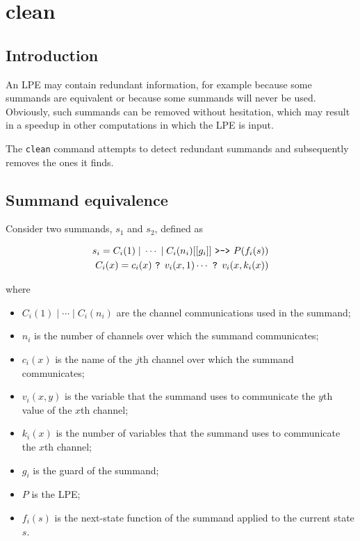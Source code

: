 \chapter{clean}

\section{Introduction}

An LPE may contain redundant information, for example because some summands are equivalent or because some summands will never be used.
Obviously, such summands can be removed without hesitation, which may result in a speedup in other computations in which the LPE is input.

The \texttt{clean} command attempts to detect redundant summands and subsequently removes the ones it finds.

\section{Summand equivalence}

Consider two summands, $s_1$ and $s_2$, defined as

\begin{align*}
s_i = C_i(1) \;|\; \cdots{} \;|\; C_i(n_i) [[g_i]] \text{ \texttt{>->} } P(f_i(s)) \\
C_i(x) = c_i(x) \text{ \texttt{?} } v_i(x,1) \cdots{} \text{ \texttt{?} } v_i(x,k_i(x))
\end{align*}

where

\begin{itemize}
\item $C_i(1) \;|\; \cdots{} \;|\; C_i(n_i)$ are the channel communications used in the summand;
\item $n_i$ is the number of channels over which the summand communicates;
\item $c_i(x)$ is the name of the $j$th channel over which the summand communicates;
\item $v_i(x,y)$ is the variable that the summand uses to communicate the $y$th value of the $x$th channel;
\item $k_i(x)$ is the number of variables that the summand uses to communicate the $x$th channel;
\item $g_i$ is the guard of the summand;
\item $P$ is the LPE;
\item $f_i(s)$ is the next-state function of the summand applied to the current state $s$.
\end{itemize}

